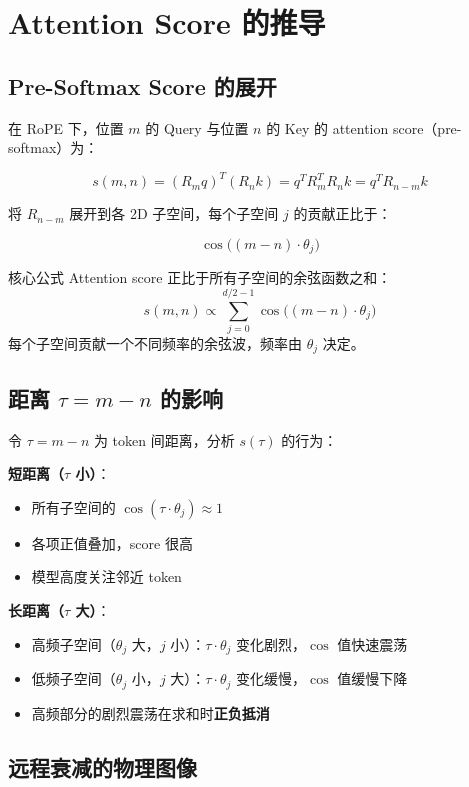 \documentclass[a4paper]{article}
\begin{document}
\section{Attention Score 的推导}

\subsection{Pre-Softmax Score 的展开}

在 RoPE 下，位置 $m$ 的 Query 与位置 $n$ 的 Key 的 attention score（pre-softmax）为：

$$
s(m,n) = (R_m q)^T (R_n k) = q^T R_m^T R_n k = q^T R_{n-m} k
$$

将 $R_{n-m}$ 展开到各 2D 子空间，每个子空间 $j$ 的贡献正比于：

$$
\cos\big((m-n) \cdot \theta_j\big)
$$

\begin{importantbox}{核心公式}
Attention score 正比于所有子空间的余弦函数之和：
$$
s(m,n) \propto \sum_{j=0}^{d/2-1} \cos\big((m-n) \cdot \theta_j\big)
$$
每个子空间贡献一个不同频率的余弦波，频率由 $\theta_j$ 决定。
\end{importantbox}

\subsection{距离 $\tau = m - n$ 的影响}

令 $\tau = m - n$ 为 token 间距离，分析 $s(\tau)$ 的行为：

\textbf{短距离（$\tau$ 小）}：
\begin{itemize}
  \item 所有子空间的 $\cos(\tau \cdot \theta_j) \approx 1$
  \item 各项正值叠加，score 很高
  \item 模型高度关注邻近 token
\end{itemize}

\textbf{长距离（$\tau$ 大）}：
\begin{itemize}
  \item 高频子空间（$\theta_j$ 大，$j$ 小）：$\tau \cdot \theta_j$ 变化剧烈，$\cos$ 值快速震荡
  \item 低频子空间（$\theta_j$ 小，$j$ 大）：$\tau \cdot \theta_j$ 变化缓慢，$\cos$ 值缓慢下降
  \item 高频部分的剧烈震荡在求和时\textbf{正负抵消}
\end{itemize}

\subsection{远程衰减的物理图像}
\end{document}
